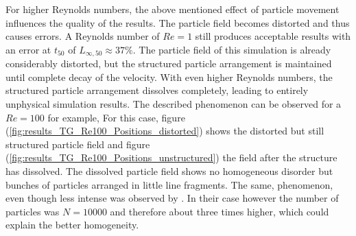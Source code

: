 \documentclass[11pt,a4paper,twoside]{report}
\begin{document}
For higher Reynolds numbers, the above mentioned effect of particle movement influences the quality of the results. The particle field becomes distorted and thus causes errors. A Reynolds number of $Re=1$ still produces acceptable results with an error at $t_{50}$ of $L_{\infty,50}\approx37\%$. The particle field of this simulation is already considerably distorted, but the structured particle arrangement is maintained until complete decay of the velocity. With even higher Reynolds numbers, the structured particle arrangement dissolves completely, leading to entirely unphysical simulation results. The described phenomenon can be observed for a $Re=100$ for example, For this case, figure (\ref{fig:results_TG_Re100_Positions_distorted}) shows the distorted but still structured particle field and figure (\ref{fig:results_TG_Re100_Positions_unstructured}) the field after the structure has dissolved. The dissolved particle field shows no homogeneous disorder but bunches of particles arranged in little line fragments. The same, phenomenon, even though less intense was observed by \cite{Ellero2007}. In their case however the number of particles was $N=10000$ and therefore about three times higher, which could explain the better homogeneity.
\end{document}
